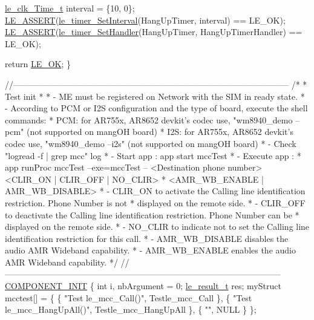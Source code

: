 \begin{DoxyCodeInclude}
{{{{{{    \hyperlink{structle__clk___time__t}{le\_clk\_Time\_t} interval = \{10, 0\};
    \hyperlink{le__log_8h_ac0dbbef91dc0fed449d0092ff0557b39}{LE\_ASSERT}(\hyperlink{le__timer_8h_a0a103d5cef5e83fc9088859d527bbd43}{le\_timer\_SetInterval}(HangUpTimer, interval) == LE\_OK);
    \hyperlink{le__log_8h_ac0dbbef91dc0fed449d0092ff0557b39}{LE\_ASSERT}(\hyperlink{update_daemon_8c_ac9249ea73392d7d9ffe947ef6829b551}{le\_timer\_SetHandler}(HangUpTimer, HangUpTimerHandler) == LE\_OK);

    \textcolor{keywordflow}{return} \hyperlink{le__basics_8h_a1cca095ed6ebab24b57a636382a6c86ca5066a4bcec691c6b67843b8f79656422}{LE\_OK};
\}

\textcolor{comment}{//--------------------------------------------------------------------------------------------------}
\textcolor{comment}{/*}
\textcolor{comment}{ * Test init}
\textcolor{comment}{ *}
\textcolor{comment}{ * - ME must be registered on Network with the SIM in ready state.}
\textcolor{comment}{ * - According to PCM or I2S configuration and the type of board, execute the shell commands:}
\textcolor{comment}{ *   PCM: for AR755x, AR8652 devkit's codec use, "wm8940\_demo --pcm" (not supported on mangOH board)}
\textcolor{comment}{ *   I2S: for AR755x, AR8652 devkit's codec use, "wm8940\_demo --i2s" (not supported on mangOH board)}
\textcolor{comment}{ * - Check "logread -f | grep mcc" log}
\textcolor{comment}{ * - Start app : app start mccTest}
\textcolor{comment}{ * - Execute app :}
\textcolor{comment}{ *  app runProc mccTest --exe=mccTest -- <Destination phone number> <CLIR\_ON | CLIR\_OFF | NO\_CLIR>}
\textcolor{comment}{ *  <AMR\_WB\_ENABLE | AMR\_WB\_DISABLE>}
\textcolor{comment}{ *   - CLIR\_ON to activate the Calling line identification restriction. Phone Number is not}
\textcolor{comment}{ * displayed on the remote side.}
\textcolor{comment}{ *   - CLIR\_OFF to deactivate the Calling line identification restriction. Phone Number can be}
\textcolor{comment}{ * displayed on the remote side.}
\textcolor{comment}{ *   - NO\_CLIR to indicate not to set the Calling line identification restriction for this call.}
\textcolor{comment}{ *   - AMR\_WB\_DISABLE disables the audio AMR Wideband capability.}
\textcolor{comment}{ *   - AMR\_WB\_ENABLE enables the audio AMR Wideband capability.}
\textcolor{comment}{ */}
\textcolor{comment}{//--------------------------------------------------------------------------------------------------}
\hyperlink{le__event_loop_8h_abdb9187a56836a93d19cc793cbd4b7ec}{COMPONENT\_INIT}
\{
    \textcolor{keywordtype}{int} i, nbArgument = 0;
    \hyperlink{le__basics_8h_a1cca095ed6ebab24b57a636382a6c86c}{le\_result\_t} res;
    myStruct mcctest[] =
    \{
                    \{ \textcolor{stringliteral}{"Test le\_mcc\_Call()"},         Testle\_mcc\_Call \},
                    \{ \textcolor{stringliteral}{"Test le\_mcc\_HangUpAll()"},    Testle\_mcc\_HangUpAll \},
                    \{ \textcolor{stringliteral}{""}, NULL \}
    \};

}}}}}}
\end{DoxyCodeInclude}
